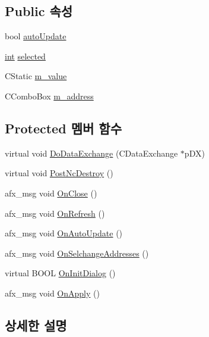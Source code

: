 \subsection*{Public 속성}
\begin{DoxyCompactItemize}
\item 
bool \mbox{\hyperlink{class_i_o_viewer_a6f3bc2241e369ffba682365f58412dc7}{auto\+Update}}
\item 
\mbox{\hyperlink{_util_8cpp_a0ef32aa8672df19503a49fab2d0c8071}{int}} \mbox{\hyperlink{class_i_o_viewer_a418dd29c924f6fa180e995ba9db8399c}{selected}}
\item 
C\+Static \mbox{\hyperlink{class_i_o_viewer_aeb772ac65eb0a1c472473b2436b83728}{m\+\_\+value}}
\item 
C\+Combo\+Box \mbox{\hyperlink{class_i_o_viewer_ab381b72aee2da8c7f3c25ba58c69c3cd}{m\+\_\+address}}
\end{DoxyCompactItemize}
\subsection*{Protected 멤버 함수}
\begin{DoxyCompactItemize}
\item 
virtual void \mbox{\hyperlink{class_i_o_viewer_aac7d35447b8dc9a733a772d67626a9a6}{Do\+Data\+Exchange}} (C\+Data\+Exchange $\ast$p\+DX)
\item 
virtual void \mbox{\hyperlink{class_i_o_viewer_aba88a6282cb5c6e57cd169a1821182be}{Post\+Nc\+Destroy}} ()
\item 
afx\+\_\+msg void \mbox{\hyperlink{class_i_o_viewer_a99c1044f4eed5c69ca652edfc032289d}{On\+Close}} ()
\item 
afx\+\_\+msg void \mbox{\hyperlink{class_i_o_viewer_a1a50f763e39ff7672a2665ab23e44ee7}{On\+Refresh}} ()
\item 
afx\+\_\+msg void \mbox{\hyperlink{class_i_o_viewer_a8e9ae4ebf837dff76500534337c0d609}{On\+Auto\+Update}} ()
\item 
afx\+\_\+msg void \mbox{\hyperlink{class_i_o_viewer_a406130e0b8572721cf8ede30d2005fa2}{On\+Selchange\+Addresses}} ()
\item 
virtual B\+O\+OL \mbox{\hyperlink{class_i_o_viewer_a4d36007016944a2ed21ee72323204f00}{On\+Init\+Dialog}} ()
\item 
afx\+\_\+msg void \mbox{\hyperlink{class_i_o_viewer_ab90a9bf33360f3410ea2d1341b61e6d9}{On\+Apply}} ()
\end{DoxyCompactItemize}


\subsection{상세한 설명}


